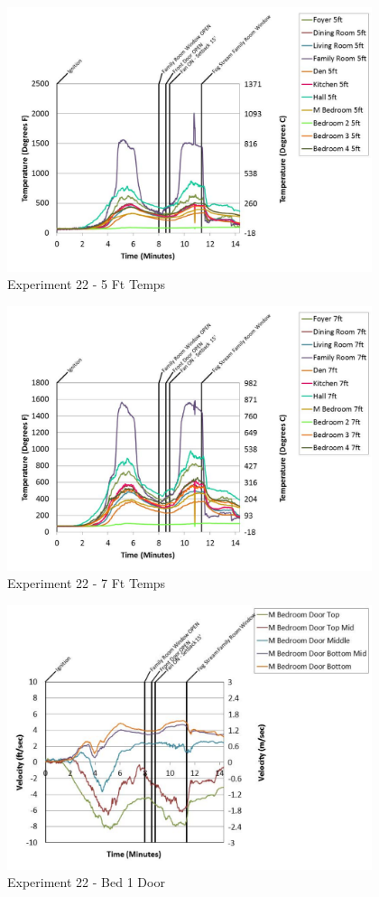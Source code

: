 \documentclass{article}
\begin{document}
\begin{appendices}
	\begin{figure}[h!]
		\centering
		\includegraphics[height=3.05in]{0_Images/Results_Charts/Exp_22_Charts/5FtTemps.pdf}
		\caption{Experiment 22 - 5 Ft Temps}
	\end{figure}
 

	\begin{figure}[h!]
		\centering
		\includegraphics[height=3.05in]{0_Images/Results_Charts/Exp_22_Charts/7FtTemps.pdf}
		\caption{Experiment 22 - 7 Ft Temps}
	\end{figure}
 
	\clearpage

	\begin{figure}[h!]
		\centering
		\includegraphics[height=3.05in]{0_Images/Results_Charts/Exp_22_Charts/Bed1Door.pdf}
		\caption{Experiment 22 - Bed 1 Door}
	\end{figure}
 


\end{appendices}
\end{document}
